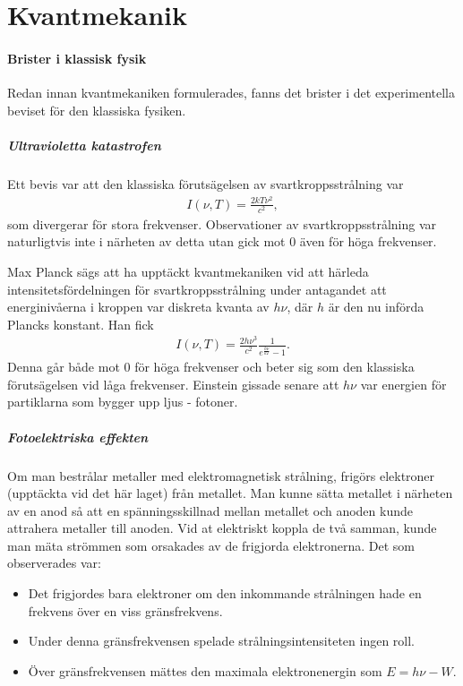 \section{Kvantmekanik}

\paragraph{Brister i klassisk fysik}
Redan innan kvantmekaniken formulerades, fanns det brister i det experimentella beviset för den klassiska fysiken.

\subparagraph{Ultravioletta katastrofen}
Ett bevis var att den klassiska förutsägelsen av svartkroppsstrålning var
\begin{align*}
	I(\nu, T) = \frac{2kT\nu^{2}}{c^{2}},
\end{align*}
som divergerar för stora frekvenser. Observationer av svartkroppsstrålning var naturligtvis inte i närheten av detta utan gick mot $0$ även för höga frekvenser.

Max Planck sägs att ha upptäckt kvantmekaniken vid att härleda intensitetsfördelningen för svartkroppsstrålning under antagandet att energinivåerna i kroppen var diskreta kvanta av $h\nu$, där $h$ är den nu införda Plancks konstant. Han fick
\begin{align*}
	I(\nu, T) = \frac{2h\nu^{3}}{c^{2}}\frac{1}{e^{\frac{h\nu}{kT}} - 1}.
\end{align*}
Denna går både mot $0$ för höga frekvenser och beter sig som den klassiska förutsägelsen vid  låga frekvenser. Einstein gissade senare att $h\nu$ var energien för partiklarna som bygger upp ljus - fotoner.

\subparagraph{Fotoelektriska effekten}
Om man bestrålar metaller med elektromagnetisk strålning, frigörs elektroner (upptäckta vid det här laget) från metallet. Man kunne sätta metallet i närheten av en anod så att en spänningsskillnad mellan metallet och anoden kunde attrahera metaller till anoden. Vid at elektriskt koppla de två samman, kunde man mäta strömmen som orsakades av de frigjorda elektronerna. Det som observerades var:
\begin{itemize}
	\item Det frigjordes bara elektroner om den inkommande strålningen hade en frekvens över en viss gränsfrekvens.
	\item Under denna gränsfrekvensen spelade strålningsintensiteten ingen roll.
	\item Över gränsfrekvensen mättes den maximala elektronenergin som $E = h\nu - W$.
\end{itemize}

